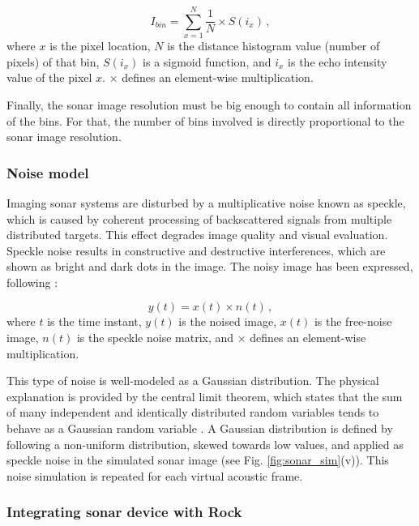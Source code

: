 \documentclass[final,5p,times]{elsarticle}
\begin{document}
\begin{equation}
    \label{eq:1}
    I_{bin} = \sum\limits_{x=1}^N \frac{1}{N} \times S(i_{x}) \, ,
\end{equation}
where $x$ is the pixel location, $N$ is the distance histogram
value (number of pixels) of that bin, $S(i_{x})$ is a sigmoid function,
and $i_{x}$ is the echo intensity value of the pixel $x$. $\times$ defines an
element-wise multiplication.

Finally, the sonar image resolution must be big enough to contain all information of the bins. For that, the number of bins involved is directly proportional to the sonar image resolution.

\subsubsection{Noise model}
\label{dev:noise}

Imaging sonar systems are disturbed by a multiplicative noise known as speckle,
which is caused by coherent processing of backscattered signals from multiple
distributed targets. This effect degrades image quality and visual evaluation. Speckle noise results in constructive and destructive interferences,
which are shown as bright and dark dots in the image. The noisy image has been
expressed, following \cite{lee1980}:

\begin{equation}
\label{eq:2}
y(t) = x(t) \times n(t) \, ,
\end{equation}
where $t$ is the time instant, $y(t)$ is the noised image, $x(t)$ is the
free-noise image, $n(t)$ is the speckle noise matrix, and $\times$ defines an
element-wise multiplication.

This type of noise is well-modeled as a Gaussian distribution. The physical explanation is provided by the central limit theorem, which states that the
sum of many independent and identically distributed random variables tends
to behave as a Gaussian random variable \cite{papoulis2002}. A Gaussian distribution is defined by following a non-uniform distribution, skewed towards low values, and applied as speckle noise in the simulated sonar image (see Fig. \ref{fig:sonar_sim}(v)). This noise simulation is repeated for each virtual acoustic frame.

\subsubsection{Integrating sonar device with Rock}
\label{dev:rock}
\end{document}
